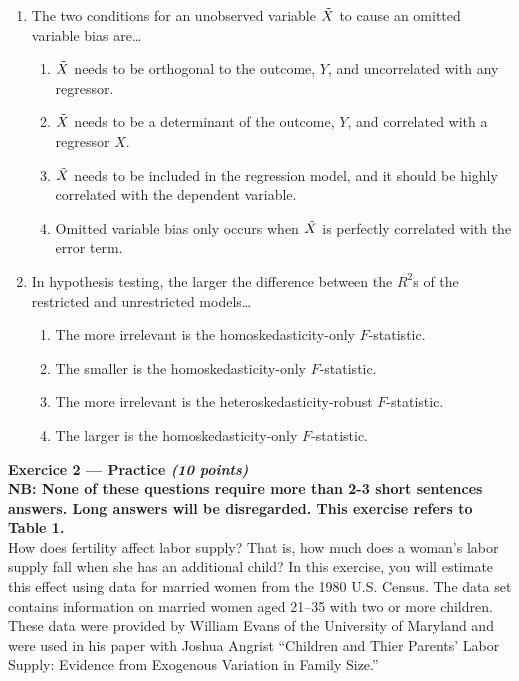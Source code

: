 \documentclass{article}
\begin{document}
\begin{enumerate}[label=\textbf{\arabic*.}]
    \item The two conditions for an unobserved variable $\Tilde{X}$ to cause an omitted variable bias are…
    \begin{enumerate}[label=\Alph*)]
        \item $\Tilde{X}$ needs to be orthogonal to the outcome, $Y$, and uncorrelated with any regressor.
        \item $\Tilde{X}$ needs to be a determinant of the outcome, $Y$, and correlated with a regressor $X$. %
        \item $\Tilde{X}$ needs to be included in the regression model, and it should be highly correlated with the dependent variable.
        \item Omitted variable bias only occurs when $\Tilde{X}$ is perfectly correlated with the error term.
    \end{enumerate}

    \item In hypothesis testing, the larger the difference between the $R^2$s of the restricted and unrestricted models…
    \begin{enumerate}[label=\Alph*)]
        \item The more irrelevant is the homoskedasticity-only $F$-statistic.
        \item The smaller is the homoskedasticity-only $F$-statistic.
        \item The more irrelevant is the heteroskedasticity-robust $F$-statistic.
        \item The larger is the homoskedasticity-only $F$-statistic. %
    \end{enumerate}

\end{enumerate}


\newpage

\textbf{Exercice 2 --- Practice \textit{(10 points)}} \\[1em] %
\textbf{NB: None of these questions require more than 2-3 short sentences answers. Long answers will be disregarded. This exercise refers to Table 1.}\\[1em]

How does fertility affect labor supply? That is, how much does a woman’s
labor supply fall when she has an additional child? In this exercise, you will
estimate this effect using data for married women from the 1980 U.S. Census. The
data set contains information on married women aged 21–35 with two or
more children. These data were provided by William Evans of the University of Maryland and were used in his paper with Joshua Angrist ``Children and Thier
Parents’ Labor Supply: Evidence from Exogenous Variation in Family Size.'' \\[1em]
\end{document}
